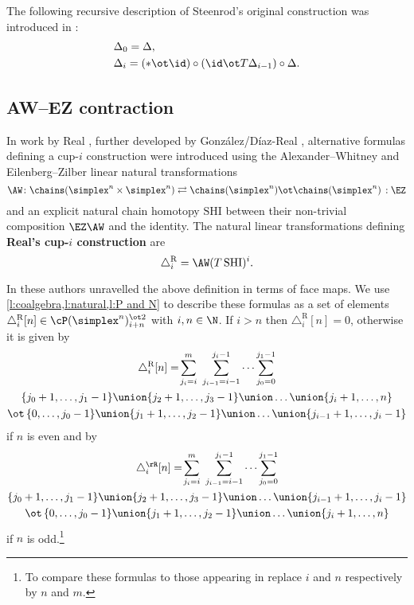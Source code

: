 \begin{remark*}
	The following recursive description of Steenrod's original construction was introduced in \cite{medina2023dennis}:
	\begin{equation}\label{e:prop cup-i}
		\begin{split}
			& \Delta_0 = \Delta, \\
			& \Delta_i =
			(\ast \ot \id) \circ (\id \ot T \Delta_{i-1}) \circ \Delta.
		\end{split}
	\end{equation}
\end{remark*}

\subsection{AW--EZ contraction}\label{ss:real}

In work by Real \cite{real1996computability}, further developed by Gonz\'alez\-/D\'iaz\--Real \cite{gonzalez-diaz1999steenrod, gonzalez2003computation, gonzalez-diaz2005cocyclic}, alternative formulas defining a \mbox{cup-$i$} construction were introduced using the Alexander--Whitney and Eilenberg--Zilber linear natural transformations
\[
\AW \colon \chains(\simplex^n \times \simplex^n)
\rightleftarrows
\chains(\simplex^n) \ot \chains(\simplex^n) \,: \EZ
\]
and an explicit natural chain homotopy $\mathrm{SHI}$ between their non-trivial composition $\EZ \AW$ and the identity.
The natural linear transformations defining \textbf{Real's \mbox{cup-$i$} construction} are
\[
\triangle^{\mathrm{R}}_i = \AW (T \, \mathrm{SHI})^i.
\]

In \cite[Theorem~3.1]{gonzalez-diaz1999steenrod} these authors unravelled the above definition in terms of face maps.
We use \cref{l:coalgebra,l:natural,l:P and N} to describe these formulas as a set of elements $\triangle_i^{\mathrm{R}} [n] \in \cP(\simplex^n)^{\ot 2}_{i+n}$ with $i,n \in \N$.
If $i > n$ then $\triangle_i^{\mathrm{R}} [n] = 0$, otherwise it is given by
\begin{multline}\label{eq:real left}
	\triangle^{\mathrm{R}}_i [n] = \!
	\sum_{j_i=i}^{m} \ \sum_{j_{i-1}=i-1}^{j_i-1} \dots \sum_{j_0=0}^{j_1-1} \\
	\{j_0+1,\dots,j_1-1\} \union \{j_2+1,\dots,j_3-1\} \union \dots \union \{j_i+1,\dots,n\} \\ \ot \,
	\{0,\dots,j_0-1\} \union \{j_1+1,\dots,j_2-1\} \union \dots \union \{j_{i-1}+1,\dots,j_i-1\}
\end{multline}
if $n$ is even and by
\begin{multline}\label{eq:real right}
	\triangle^\rR_i [n] = \!
	\sum_{j_i=i}^{m} \ \sum_{j_{i-1}=i-1}^{j_i-1} \dots \sum_{j_0=0}^{j_1-1} \\
	\{j_0+1,\dots,j_1-1\} \union \{j_2+1,\dots,j_3-1\} \union \dots \union \{j_{i-1}+1,\dots,j_i-1\} \\ \ot \,
	\{0,\dots,j_0-1\} \union \{j_1+1,\dots,j_2-1\} \union \dots \union \{j_i+1,\dots,n\}
\end{multline}
if $n$ is odd.\footnote{To compare these formulas to those appearing in \cite[Theorem~3.1]{gonzalez-diaz1999steenrod} replace $i$ and $n$ respectively by $n$ and $m$.}

